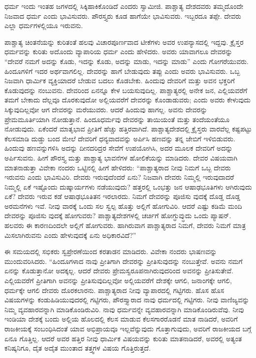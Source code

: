 ಧರ್ಮ ಇಂದು ಇಂತಹ ಜಗಳದಲ್ಲಿ ಸಿಕ್ಕಿಹಾಕಿಕೊಂಡಿದೆ ಎಂದರು ಸ್ವಾಮೀಜಿ. ಪಾಶ್ಚಾತ್ಯ ದೇಶದವರು ತಮ್ಮದೊಂದೇ ನಿಜವಾದ ಧರ್ಮ ಎಂದು ಭಾವಿಸುವರು. ಪೌರಸ್ತ್ಯರು ಕೂಡ ಹಾಗೆಯೇ ಭಾವಿಸುವರು. ಇಬ್ಬರದೂ ತಪ್ಪೇ. ದೇವರು ಎಲ್ಲಾ ಧರ್ಮಗಳಲ್ಲಿಯೂ ಇರುವನು.

ಪಾಶ್ಚಾತ್ಯ ಚಿಂತನೆಯನ್ನು ಕುರಿತಂತೆ ಹಲವು ವಿಚಾರಪೂರ್ಣವಾದ ಟೀಕೆಗಳು ಅವರ ಉಪನ್ಯಾಸದಲ್ಲಿ ಇದ್ದವು. ಕ್ರೈಸ್ತರ ಧರ್ಮವನ್ನು ಕುರಿತು ಅದೊಂದು ವ್ಯಾಪಾರಿಯ ಧರ್ಮ ಎಂದು ಹೇಳಿದರು. ಅವರು ಯಾವಾಗಲೂ ದೇವರನ್ನು “ದೇವರೆ ನಮಗೆ ಅದನ್ನು ಕೊಡು, ಇದನ್ನು ಕೊಡು, ಅದನ್ನು ಮಾಡು, ಇದನ್ನು ಮಾಡು” ಎಂದು ಗೋಗರೆಯುವರು. ಹಿಂದೂಗಳಿಗೆ ಇದರ ಅರ್ಥವಾಗಲಿಲ್ಲ. ದೇವರನ್ನು ಹಾಗೆ ಬೇಡುವುದು ತಪ್ಪು ಎಂದು ಅವರು ಭಾವಿಸುವರು. ಒಬ್ಬ ನಿಜವಾಗಿ ಧಾರ್ಮಿಕ ವ್ಯಕ್ತಿಯಾದರೆ ಬೇಡುವ ಬದಲು ಕೊಡಬೇಕು. ಹಿಂದುವು ದೇವರಿಗೆ ಮತ್ತು ಅವನ ಭಕ್ತರಿಗೆ ಕೊಡುವುದನ್ನು ನಂಬುವನು. ದೇವರಿಂದ ಏನನ್ನೂ ಕೇಳ ಬಯಸುವುದಿಲ್ಲ. ಪಾಶ್ಚಾತ್ಯರಲ್ಲಿ ಅನೇಕ ಜನ, ಎಲ್ಲಿಯವರೆಗೆ ತಮಗೆ ಬೇಕಾದು ದೆಲ್ಲವೂ ದೊರಕುವುದೋ ಅಲ್ಲಿಯವರೆಗೆ ದೇವರನ್ನು ಕೊಂಡಾಡುವರು; ಎಂದು ಅವರು ಕೇಳುವುದು ಸಿಕ್ಕುವುದಿಲ್ಲವೋ ಆಗ ದೇವರನ್ನು ಮರೆಯುವರು. ಆದರೆ ಹಿಂದುವು ಹಾಗಲ್ಲ. ಅವನು ದೇವರನ್ನು ಪ್ರೇಮಮೂರ್ತಿಯಾಗಿ ನೋಡುತ್ತಾನೆ. ಹಿಂದೂಧರ್ಮವು ದೇವರನ್ನು ತಾಯಿಯಂತೆ ಮತ್ತು ತಂದೆಯಂತೆಯೂ ನೋಡುವುದು. ಏಕೆಂದರೆ ಮಾತೃಭಾವ ಪ್ರೀತಿಗೆ ಹೆಚ್ಚು ಹತ್ತಿರವಾಗಿದೆ. ಪಾಶ್ಚಾತ್ಯದೇಶದಲ್ಲಿ ಕ್ರೈಸ್ತರು ವಾರವೆಲ್ಲ ಕಷ್ಟಪಟ್ಟು ಕೆಲಸಮಾಡಿ ದುಡ್ಡು ಬಂದ ಮೇಲೆ ದೇವರಿಗೆ ಧನ್ಯವಾದವನ್ನು ಅರ್ಪಿಸಿ ಹಣವನ್ನು ತನ್ನ ಜೇಬಿಗೆ ಇಳಿಬಿಡುವರು. ಹಿಂದುವು ಹಣವನ್ನುಗಳಿಸಿ ಅದನ್ನು ದೀನದರಿದ್ರರ ಸೇವೆಗೆ ಉಪಯೋಗಿಸಿ, ಅದರ ಮೂಲಕ ದೇವರಿಗೆ ಅದನ್ನು ಅರ್ಪಿಸುವನು. ಹೀಗೆ ಪೌರಸ್ತ್ಯ ಮತ್ತು ಪಾಶ್ಚಾತ್ಯ ಭಾವನೆಗಳ ಹೋಲಿಕೆಯನ್ನು ಮಾಡಿದರು. ದೇವರ ವಿಷಯವಾಗಿ ಮಾತನಾಡುತ್ತಾ ವಿವೇಕಾ ನಂದರು ಒಟ್ಟಿನಲ್ಲಿ ಹೀಗೆ ಹೇಳಿದರು: “ಪಾಶ್ಚಾತ್ಯರಾದ ನೀವು ನಿಮಗೆ ಒಬ್ಬ ದೇವರು ಇರುವನು ಎಂದು ಭಾವಿಸುವಿರಿ. ದೇವರು ಇರುವುದೆಂದರೆ ಏನು? ನಿಜವಾಗಿ ದೇವರು ನಿಮ್ಮಲ್ಲಿ ಇರುವುದಾದರೆ ನಿಮ್ಮಲ್ಲಿ ಏಕೆ ಇಷ್ಟೊಂದು ದುಷ್ಕಾರ್ಯಗಳು ನಡೆಯುವುದು? ಹತ್ತರಲ್ಲಿ ಒಂಭತ್ತು ಜನ ಆಷಾಢಭೂತಿಗಳು ಆಗಿರುವುದು ಏಕೆ? ದೇವರು ಇರುವ ಕಡೆ ಆಷಾಢಭೂತಿತನ ಇರಲಾರದು. ನಿಮಗೆ ದೇವರನ್ನು ಪೂಜಿಸು ವುದಕ್ಕೆ ದೊಡ್ಡ ದೊಡ್ಡ ಅರಮನೆಗಳು ಇವೆ. ನೀವು ವಾರಕ್ಕೆ ಒಂದು ಸಲ ಸ್ವಲ್ಪ ಹೊತ್ತು ಅಲ್ಲಿಗೆ ಹೋಗುವಿರಿ. ಆದರೆ ಎಷ್ಟು ಕಡಿಮೆ ಮಂದಿ ದೇವರನ್ನು ಪೂಜಿಸು ವುದಕ್ಕೆ ಹೋಗುವರು? ಪಾಶ್ಚಾತ್ಯದೇಶಗಳಲ್ಲಿ ಚರ್ಚಿಗೆ ಹೋಗ್ಧುವ್ಧುದು ಒಂದು ಪ್ಯಾಷನ್. ಹಲವರು ಈ ಕಾರಣದಿಂದಲೇ ಅಲ್ಲಿಗೆ ಹೋಗುವರು. ಹಾಗಿರುವಾಗ ಪಾಶ್ಚಾತ್ಯರಾದ ನಿಮಗೆ, ದೇವರು ನಿಮಗೆ ಮಾತ್ರ ಮಿಸಲಾಗಿರುವನು ಎಂದು ಹೇಳುವುದಕ್ಕೆ ಏನು ಅಧಿಕಾರವಿದೆ?''

ಈ ಸಮಯದಲ್ಲಿ ಸಭಿಕರು ಸ್ವಪ್ರೇರಣೆಯಿಂದ ಕರತಾಡನ ಮಾಡಿದರು. ವಿವೇಕಾ ನಂದರು ಭಾಷಣವನ್ನು ಮುಂದುವರಿಸಿದರು. “ಹಿಂದೂಗಳಾದ ನಾವು ಪ್ರೀತಿಗಾಗಿ ದೇವರನ್ನು ಪ್ರೀತಿಸುವುದನ್ನು ನಂಬುತ್ತೇವೆ. ಅವನು ನಮಗೆ ಏನನ್ನು ಕೊಡುತ್ತಾನೋ ಅದಕ್ಕಲ್ಲ. ಆದರೆ ದೇವರು ಪ್ರೇಮಸ್ವರೂಪನಾಗಿರುವುದರಿಂದ ಅವನನ್ನು ಪ್ರೀತಿಸುತೇವೆ. ಎಲ್ಲಿಯವರೆಗೆ ಪ್ರೀತಿಗಾಗಿ ಅವನನ್ನು ಪ್ರೀತಿಸುವುದಿಲ್ಲವೋ ಅಲ್ಲಿಯವರೆಗೆ ದೇಶಕ್ಕೇ ಆಗಲಿ, ಜನಾಂಗಕ್ಕೇ ಆಗಲಿ, ಧರ್ಮಕ್ಕೇ ಆಗಲಿ ದೇವರು ದೊರಕಲಾರನು. ಪಾಶ್ಚಾತ್ಯರಾದ ನೀವು ವ್ಯಾಪಾರದಲ್ಲಿ ಗಟ್ಟಿಗರು. ಹೊಸ ಹೊಸ ವಿಷಯಗಳನ್ನು ಕಂಡುಹಿಡಿಯುವುದರಲ್ಲಿ ಗಟ್ಟಿಗರು, ಪೌರಸ್ತ್ಯಾರಾದ ನಾವು ಧರ್ಮದಲ್ಲಿ ಗಟ್ಟಿಗರು. ನೀವು ವಾಣಿಜ್ಯವನ್ನು ನಿಮ್ಮ ವ್ಯವಹಾರವನ್ನಾಗಿ ಮಾಡಿಕೊಂಡಿರುವಿರಿ. ನಾವು ಧರ್ಮವನ್ನೇ ವ್ಯವಹಾರವನ್ನಾಗಿ ಮಾಡಿಕೊಂಡಿರುವೆವು. ನೀವು ಇಂಡಿಯಾ ದೇಶಕ್ಕೆ ಬಂದು ಅಲ್ಲಿಯ ಹೊಲದಲ್ಲಿ ಕೆಲಸ ಮಾಡುವ ಕೆಲಸಗಾರರೊಡನೆ ಮಾತ ನಾಡಿದರೆ, ಅವರಿಗೆ ರಾಜಕೀಯಕ್ಕೆ ಸಂಬಂಧಿಸಿದಂತೆ ಯಾವ ಅಭಿಪ್ರಾಯವೂ ಇಲ್ಲವೆನ್ನುವುದು ಗೊತ್ತಾಗುವುದು, ಅವರಿಗೆ ರಾಜಕೀಯದ ಬಗ್ಗೆ ಏನೂ ಗೊತ್ತಿಲ್ಲ. ಆದರೆ ಅವರ ಹತ್ತಿರ ನೀವು ಧಾರ್ಮಿಕ ವಿಷಯವನ್ನು ಕುರಿತು ಮಾತನಾಡಿದರೆ, ಅವರಲ್ಲಿ ಅತ್ಯಂತ ಕನಿಷ್ಕನಿಗೂ, ದೈತ ಅದೈತ ಮುಂತಾದ ತತ್ತ್ವಗಳ ವಿಷಯ ಗೊತ್ತಿರುತ್ತದೆ.

